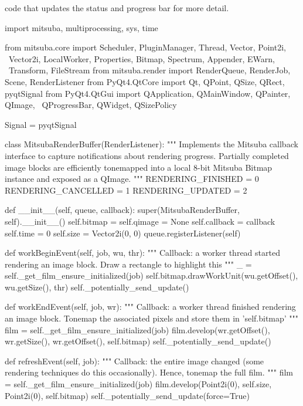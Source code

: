 code that updates the status and progress bar for more detail.
\begin{python}
import mitsuba, multiprocessing, sys, time

from mitsuba.core import Scheduler, PluginManager, Thread, Vector, Point2i, \
    Vector2i, LocalWorker, Properties, Bitmap, Spectrum, Appender, EWarn, \
    Transform, FileStream
from mitsuba.render import RenderQueue, RenderJob, Scene, RenderListener
from PyQt4.QtCore import Qt, QPoint, QSize, QRect, pyqtSignal
from PyQt4.QtGui import QApplication, QMainWindow, QPainter, QImage, \
    QProgressBar, QWidget, QSizePolicy

Signal = pyqtSignal

class MitsubaRenderBuffer(RenderListener):
    """
    Implements the Mitsuba callback interface to capture notifications about
    rendering progress. Partially completed image blocks are efficiently
    tonemapped into a local 8-bit Mitsuba Bitmap instance and exposed as a QImage.
    """
    RENDERING_FINISHED  = 0
    RENDERING_CANCELLED = 1
    RENDERING_UPDATED   = 2

    def __init__(self, queue, callback):
        super(MitsubaRenderBuffer, self).__init__()
        self.bitmap = self.qimage = None
        self.callback = callback
        self.time = 0
        self.size = Vector2i(0, 0)
        queue.registerListener(self)

    def workBeginEvent(self, job, wu, thr):
        """ Callback: a worker thread started rendering an image block.
            Draw a rectangle to highlight this """
        _ = self._get_film_ensure_initialized(job)
        self.bitmap.drawWorkUnit(wu.getOffset(), wu.getSize(), thr)
        self._potentially_send_update()

    def workEndEvent(self, job, wr):
        """ Callback: a worker thread finished rendering an image block.
            Tonemap the associated pixels and store them in 'self.bitmap' """
        film = self._get_film_ensure_initialized(job)
        film.develop(wr.getOffset(), wr.getSize(), wr.getOffset(), self.bitmap)
        self._potentially_send_update()

    def refreshEvent(self, job):
        """ Callback: the entire image changed (some rendering techniques
            do this occasionally). Hence, tonemap the full film. """
        film = self._get_film_ensure_initialized(job)
        film.develop(Point2i(0), self.size, Point2i(0), self.bitmap)
        self._potentially_send_update(force=True)


\end{python}
